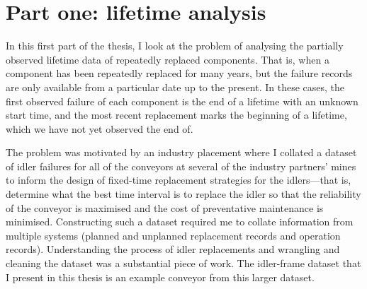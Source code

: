\documentclass[apa,colorlinks,emptypage]{curtinThesis}
\begin{document}
\createtitlepage %

\plagiarismstatement %

\showthesisquote %











\part{Part one: lifetime analysis}\label{part:one}

In this first part of the thesis, I look at the problem of analysing the partially observed lifetime data of repeatedly replaced components. That is, when a component has been repeatedly replaced for many years, but the failure records are only available from a particular date up to the present. In these cases, the first observed failure of each component is the end of a lifetime with an unknown start time, and the most recent replacement marks the beginning of a lifetime, which we have not yet observed the end of.

The problem was motivated by an industry placement where I collated a dataset of idler failures for all of the conveyors at several of the industry partners' mines to inform the design of fixed-time replacement strategies for the idlers---that is, determine what the best time interval is to replace the idler so that the reliability of the conveyor is maximised and the cost of preventative maintenance is minimised. Constructing such a dataset required me to collate information from multiple systems (planned and unplanned replacement records and operation records). Understanding the process of idler replacements and wrangling and cleaning the dataset was a substantial piece of work. The idler-frame dataset that I present in this thesis is an example conveyor from this larger dataset.
\end{document}
